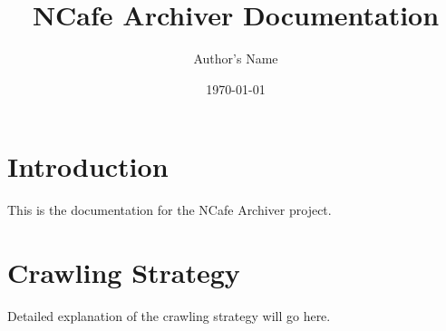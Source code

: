 \documentclass{article}
\begin{document}
\title{NCafe Archiver Documentation}
\author{Author's Name}
\date{\today}
\maketitle
\section{Introduction}
This is the documentation for the NCafe Archiver project.
\section{Crawling Strategy}
Detailed explanation of the crawling strategy will go here.
\end{document}
